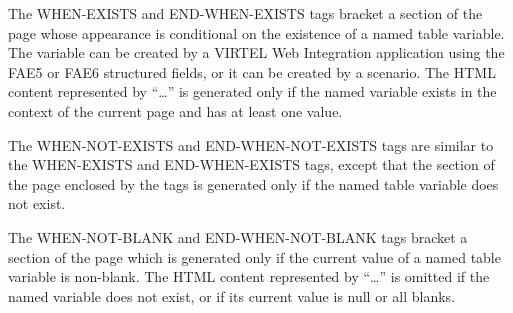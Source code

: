 \documentclass[letterpaper,10pt,english]{sphinxmanual}
\begin{document}
The WHEN-EXISTS and END-WHEN-EXISTS tags bracket a section of the page whose appearance is conditional on the existence of a named table variable. The variable can be created by a VIRTEL Web Integration application using the FAE5 or FAE6 structured fields, or it can be created by a scenario. The HTML content represented by “…” is generated only if the named variable exists in the context of the current page and has at least one value.


\begin{sphinxVerbatim}[commandchars=\\\{\}]
 
 
\end{sphinxVerbatim}

The WHEN-NOT-EXISTS and END-WHEN-NOT-EXISTS tags are similar to the WHEN-EXISTS and END-WHEN-EXISTS tags, except that the section of the page enclosed by the tags is generated only if the named table variable does not exist.


\begin{sphinxVerbatim}[commandchars=\\\{\}]
 
 
\end{sphinxVerbatim}

The WHEN-NOT-BLANK and END-WHEN-NOT-BLANK tags bracket a section of the page which is generated only if the current value of a named table variable is non-blank. The HTML content represented by “…” is omitted if the named variable does not exist, or if its current value is null or all blanks.
\end{document}
